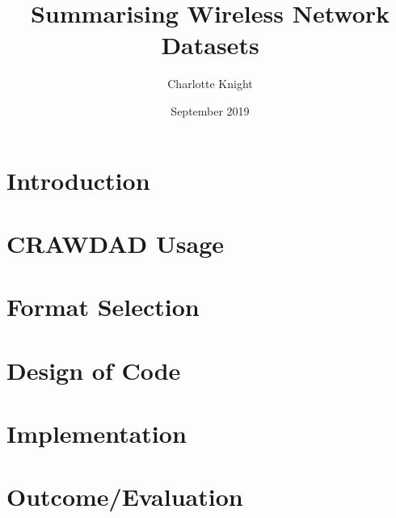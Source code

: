 \documentclass{article}
\title{Summarising Wireless Network Datasets}
\author{Charlotte Knight}
\date{September 2019}
\begin{document}
\maketitle

\newpage
\tableofcontents
\newpage

\section{Introduction}


\section{CRAWDAD Usage}


\section{Format Selection}


\section{Design of Code}


\section{Implementation}


\section{Outcome/Evaluation}


\newpage

\nocite{*}
\printbibliography
\end{document}
